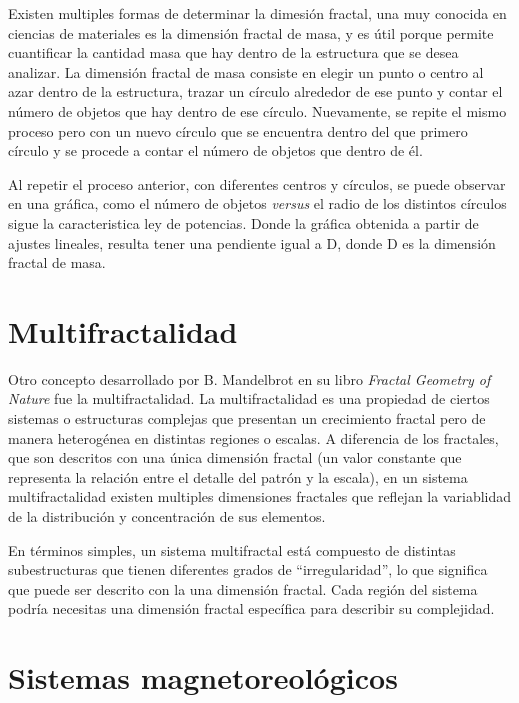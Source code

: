 Existen multiples formas de determinar la dimesi\'{o}n fractal, una muy conocida en ciencias de materiales es la dimensi\'{o}n fractal de masa, y es \'{u}til porque permite cuantificar la cantidad masa que hay dentro de la estructura que se desea analizar. La dimensi\'{o}n fractal de masa consiste en elegir un punto o centro al azar dentro de la estructura, trazar un c\'{i}rculo alrededor de ese punto y contar el n\'{u}mero de objetos que hay dentro de ese c\'{i}rculo. Nuevamente, se repite el mismo proceso pero con un nuevo c\'{i}rculo que se encuentra dentro del que primero c\'{i}rculo y se procede a contar el n\'{u}mero de objetos que dentro de \'{e}l.

 Al repetir el proceso anterior, con diferentes centros y c\'{i}rculos, se puede observar en una gr\'{a}fica, como el n\'{u}mero de objetos \textit{versus} el radio de los distintos c\'{i}rculos sigue la caracteristica ley de potencias. Donde la gr\'{a}fica obtenida a partir de ajustes lineales, resulta tener una pendiente igual a D, donde D es la dimensi\'{o}n fractal de masa. 

\section{Multifractalidad}

Otro concepto desarrollado por B. Mandelbrot en su libro \textit{Fractal Geometry of Nature} fue la multifractalidad. La multifractalidad es una propiedad de ciertos sistemas o estructuras complejas que presentan un crecimiento fractal pero de manera heterog\'{e}nea en distintas regiones o escalas. A diferencia de los fractales, que son descritos con una \'{u}nica dimensi\'{o}n fractal (un valor constante que representa la relaci\'{o}n entre el detalle del patr\'{o}n y la escala), en un sistema multifractalidad existen multiples dimensiones fractales que reflejan la variablidad de la distribuci\'{o}n y concentraci\'{o}n de sus elementos. 

En t\'{e}rminos simples, un sistema multifractal est\'{a} compuesto de distintas subestructuras que tienen diferentes grados de ``irregularidad'', lo que significa que puede ser descrito con la una dimensi\'{o}n fractal. Cada regi\'{o}n del sistema podr\'{i}a necesitas una dimensi\'{o}n fractal espec\'{i}fica para describir su complejidad.


\section{Sistemas magnetoreol\'{o}gicos}

